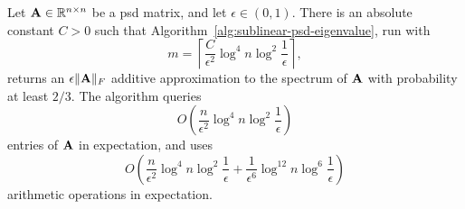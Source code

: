 \begin{theorem}
\label{thm:sublinear-psd-eigenvalue}
Let \(\mathbf{A}\in\mathbb{R}^{n\times n}\) be a psd matrix, and let
\(\epsilon\in(0,1)\). There is an absolute constant \(C>0\) such that
Algorithm~\ref{alg:sublinear-psd-eigenvalue}, run with
\[
    m =
    \left\lceil
    \frac{C}{\epsilon^2}
    \log^4 n
    \log^2\frac{1}{\epsilon}
    \right\rceil,
\]
returns an $\epsilon\|\mathbf{A}\|_F$ additive approximation to the spectrum of $\mathbf{A}$ with probability at least \(2/3\). The algorithm queries
\[
    O\!\left(
        \frac{n}{\epsilon^2}
        \log^4 n
        \log^2\frac{1}{\epsilon}
    \right)
\]
entries of \(\mathbf{A}\) in expectation, and uses
\[
    O\!\left(
        \frac{n}{\epsilon^2}
        \log^4 n
        \log^2\frac{1}{\epsilon}
        +
        \frac{1}{\epsilon^6}
        \log^{12} n
        \log^6\frac{1}{\epsilon}
    \right)
\]
arithmetic operations in expectation.
\end{theorem}

